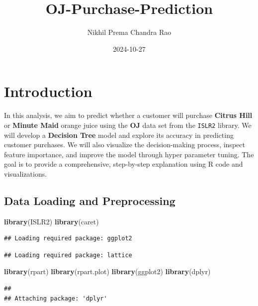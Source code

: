\documentclass[
]{article}
\title{OJ-Purchase-Prediction}
\author{Nikhil Prema Chandra Rao}
\date{2024-10-27}
\newenvironment{Shaded}{\begin{snugshade}}{\end{snugshade}}
\newcommand{\FunctionTok}[1]{\textcolor[rgb]{0.13,0.29,0.53}{\textbf{#1}}}
\newcommand{\NormalTok}[1]{#1}
\begin{document}
\maketitle

\hypertarget{introduction}{%
\section{Introduction}\label{introduction}}

In this analysis, we aim to predict whether a customer will purchase
\textbf{Citrus Hill} or \textbf{Minute Maid} orange juice using the
\textbf{OJ} data set from the \texttt{ISLR2} library. We will develop a
\textbf{Decision Tree} model and explore its accuracy in predicting
customer purchases. We will also visualize the decision-making process,
inspect feature importance, and improve the model through hyper
parameter tuning. The goal is to provide a comprehensive, step-by-step
explanation using R code and visualizations.

\hypertarget{data-loading-and-preprocessing}{%
\subsection{Data Loading and
Preprocessing}\label{data-loading-and-preprocessing}}

\begin{Shaded}
\begin{Highlighting}[]
\FunctionTok{library}\NormalTok{(ISLR2)}
\FunctionTok{library}\NormalTok{(caret)}
\end{Highlighting}
\end{Shaded}

\begin{verbatim}
## Loading required package: ggplot2
\end{verbatim}

\begin{verbatim}
## Loading required package: lattice
\end{verbatim}

\begin{Shaded}
\begin{Highlighting}[]
\FunctionTok{library}\NormalTok{(rpart)}
\FunctionTok{library}\NormalTok{(rpart.plot)}
\FunctionTok{library}\NormalTok{(ggplot2)}
\FunctionTok{library}\NormalTok{(dplyr)}
\end{Highlighting}
\end{Shaded}

\begin{verbatim}
## 
## Attaching package: 'dplyr'
\end{verbatim}
\end{document}
